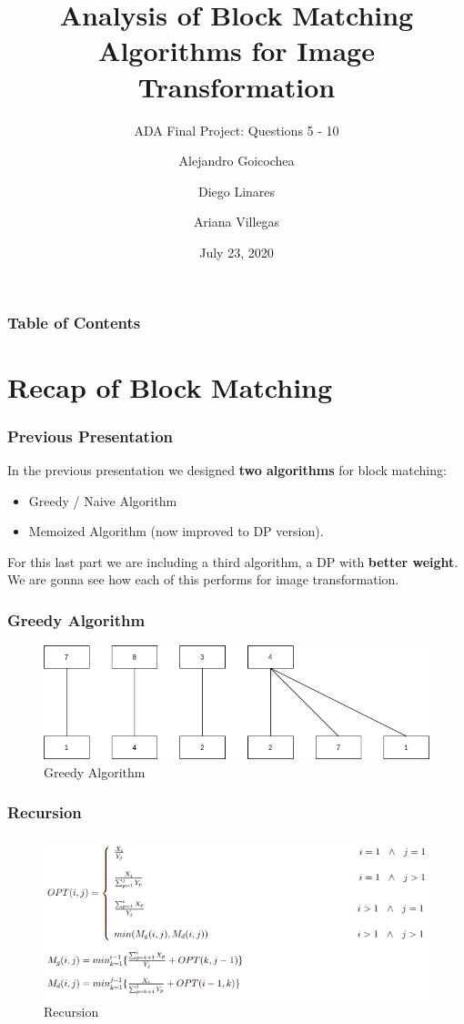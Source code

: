\documentclass{beamer}
\title{Analysis of Block Matching Algorithms for Image Transformation}
\subtitle{ADA Final Project: Questions 5 - 10}
\author{Alejandro Goicochea\and Diego Linares\and Ariana Villegas}
\institute{\inst{}Universidad de Ingeniería y Tecnología}
\date{July 23, 2020}
\begin{document}
  \frame{\titlepage}
  \begin{frame}
    \frametitle{Table of Contents}
    \tableofcontents
  \end{frame}
  \section{Recap of Block Matching}
    \begin{frame}
      \frametitle{Previous Presentation}
      In the previous presentation we designed \textbf{two algorithms} for block matching:
      \begin{itemize}
        \item Greedy / Naive Algorithm
        \item Memoized Algorithm (now improved to DP version).
      \end{itemize}
      \medskip
      For this last part we are including a third algorithm, a DP with \textbf{better weight}.\\
      \medskip
      We are gonna see how each of this performs for image transformation. 
    \end{frame}
    
    \begin{frame}
      \frametitle{Greedy Algorithm}
      
      \begin{figure}
		\centering
		\includegraphics[scale=.48]{greedy.png}
		\caption{Greedy Algorithm}
		\label{fig:greedy_algorithm}
	  \end{figure}
      
    \end{frame}
    
    \begin{frame}
      \frametitle{Recursion}
      
      \begin{figure}
		\centering
		\includegraphics[scale=.48]{recursion.png}
		\caption{Recursion}
		\label{fig:Recursion}
	  \end{figure}
      
    \end{frame}
    
\end{document}
